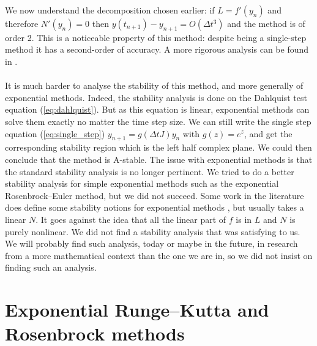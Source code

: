       We now understand the decomposition chosen earlier: if $L = f'\left(y_n\right)$ and therefore $N'\left(y_n\right) = 0$ then $y\left(t_{n+1}\right) - y_{n+1} = O\left(\Delta t^3\right)$ and the method is of order 2.
      This is a noticeable property of this method: despite being a single-step method it has a second-order of accuracy.
      A more rigorous analysis can be found in \cite{HochbruckOstermannSchweitzer2009}.

      \paragraph{}
      It is much harder to analyse the stability of this method, and more generally of exponential methods.
      Indeed, the stability analysis is done on the Dahlquist test equation (\ref{eq:dahlquist}).
      But as this equation is linear, exponential methods can solve them exactly no matter the time step size.
      We can still write the single step equation (\ref{eq:single_step}) $y_{n+1} = g\left(\Delta tJ\right)y_n$ with $g\left(z\right) = e^z$, and get the corresponding stability region which is the left half complex plane.
      We could then conclude that the method is A-stable.
      The issue with exponential methods is that the standard stability analysis is no longer pertinent.
      We tried to do a better stability analysis for simple exponential methods such as the exponential Rosenbrock--Euler method, but we did not succeed.
      Some work in the literature does define some stability notions for exponential methods \cite{DuZhu2004}, but usually takes a linear $N$.
      It goes against the idea that all the linear part of $f$ is in $L$ and $N$ is purely nonlinear.
      We did not find a stability analysis that was satisfying to us.
      We will probably find such analysis, today or maybe in the future, in research from a more mathematical context than the one we are in, so we did not insist on finding such an analysis.


  \section{Exponential Runge--Kutta and Rosenbrock methods}

